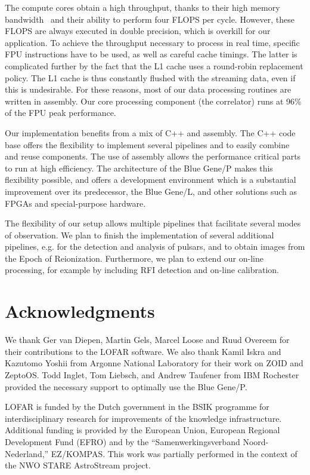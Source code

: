 \documentclass{sig-alternate}
\begin{document}
The compute cores obtain a high throughput, thanks to their high
memory bandwidth~\cite{Nieuwpoort:09} and their ability to perform
four FLOPS per cycle. However, these FLOPS are always executed in
double precision, which is overkill for our application.
To achieve the throughput necessary to 
process in real time, specific FPU instructions have to be used, as
well as careful cache timings. The latter is complicated further by
the fact that the L1 cache uses a round-robin replacement policy. The
L1 cache is thus constantly flushed with the streaming data, even if
this is undesirable. For these reasons, most of our data processing
routines are written in assembly. Our core processing component (the
correlator) runs at 96\% of the FPU peak performance.

Our implementation benefits from a mix of C++ and assembly. The C++
code base offers the flexibility to implement several pipelines and to
easily combine and reuse components. The use of assembly allows the
performance critical parts to run at high efficiency. The architecture
of the Blue Gene/P makes this flexibility possible, and offers a
development environment which is a substantial improvement over its
predecessor, the Blue Gene/L, and other solutions such as FPGAs and
special-purpose hardware.

The flexibility of our setup allows multiple pipelines that facilitate
several modes of observation.  We plan to finish the implementation of
several additional pipelines, e.g. for the detection and analysis of
pulsars, and to obtain images from the
Epoch of Reionization. Furthermore, we plan to extend our on-line
processing, for example by including RFI detection and on-line
calibration.


\section*{Acknowledgments}

We thank Ger van Diepen, Martin Gels, Marcel Loose and Ruud Overeem
for their contributions to the LOFAR software.
We also thank Kamil Iskra and Kazutomo Yoshii from Argonne National Laboratory
for their work on ZOID and ZeptoOS.
Todd Inglet, Tom Liebsch, and Andrew Taufener from IBM Rochester provided the
necessary support to optimally use the Blue Gene/P.

LOFAR is funded by the Dutch government in the BSIK programme for
interdisciplinary research for improvements of the knowledge
infrastructure.  Additional funding is provided by the European Union,
European Regional Development Fund (EFRO) and by the
``Samenwerkingsverband Noord-Nederland,'' EZ/KOMPAS. This work was
partially performed in the context of the NWO STARE AstroStream
project.



\end{document}
